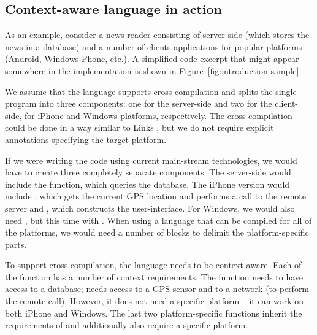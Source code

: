 
\subsection{Context-aware language in action}

As an example, consider a news reader consisting of server-side (which stores the news in a 
database) and a number of clients applications for popular platforms (Android, Windows Phone, etc.). 
A simplified code excerpt that might appear somewhere in the implementation is shown in
Figure~\ref{fig:introduction-sample}. 

We assume that the language supports cross-compilation and splits the single program into three
components: one for the server-side and two for the client-side, for iPhone and Windows platforms, 
respectively. The cross-compilation could be done in a way similar to Links \cite{app-distributed-links},
but we do not require explicit annotations specifying the target platform.

If we were writing the code using current main-stream technologies, we would have to create three 
completely separate components. The server-side would include the  function, which
queries the database. The iPhone version would include , which gets the current
GPS location and performs a call to the remote server and , which constructs the
user-interface. For Windows, we would also need , but this time with 
. When using a language that can be compiled for all of the platforms, we would need
a number of  blocks to delimit the platform-specific parts.

To support cross-compilation, the language needs to be context-aware. Each of the function has a 
number of context requirements. The  function needs to have access to a database;
 needs access to a GPS sensor and to a network (to perform the remote call).
However, it does not need a specific platform -- it can work on both iPhone and Windows. The last
two platform-specific functions inherit the requirements of  and additionally
also require a specific platform.



